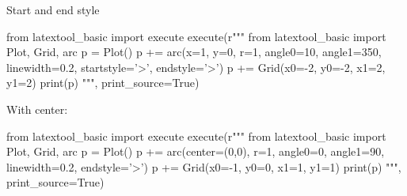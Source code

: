 Start and end style
\begin{python}
from latextool_basic import execute
execute(r"""
from latextool_basic import Plot, Grid, arc
p = Plot()
p += arc(x=1, y=0, r=1, angle0=10, angle1=350, 
        linewidth=0.2, startstyle='>', endstyle='>')
p += Grid(x0=-2, y0=-2, x1=2, y1=2)
print(p)
""", print_source=True)
\end{python}


With center:
\begin{python}
from latextool_basic import execute
execute(r"""
from latextool_basic import Plot, Grid, arc
p = Plot()
p += arc(center=(0,0), r=1, angle0=0, angle1=90, 
        linewidth=0.2, endstyle='>')
p += Grid(x0=-1, y0=0, x1=1, y1=1)
print(p)
""", print_source=True)
\end{python}
